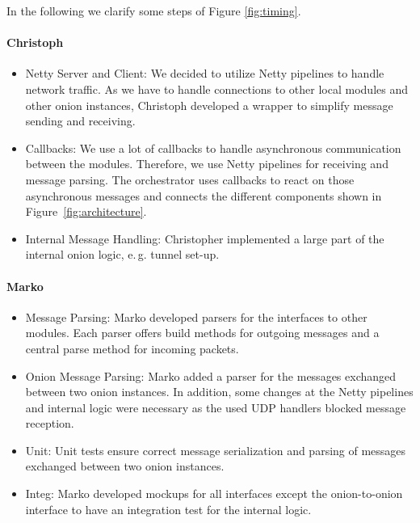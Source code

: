 \documentclass[paper=letter, fontsize=12pt]{article}
\begin{document}
\noindent
In the following we clarify some steps of Figure \ref{fig:timing}.
\paragraph{Christoph}
    \begin{itemize}
        \item Netty Server and Client: We decided to utilize Netty pipelines to handle network traffic. As we have to handle connections to other local modules and other onion instances, Christoph developed a wrapper to simplify message sending and receiving.
        \item Callbacks: We use a lot of callbacks to handle asynchronous communication between the modules. Therefore, we use Netty pipelines for receiving and message parsing. The orchestrator uses callbacks to react on those asynchronous messages and connects the different components shown in Figure~\ref{fig:architecture}.
        \item Internal Message Handling: Christopher implemented a large part of the internal onion logic, e.\,g. tunnel set-up.
    \end{itemize}
\paragraph{Marko}
    \begin{itemize}
        \item Message Parsing: Marko developed parsers for the interfaces to other modules. Each parser offers build methods for outgoing messages and a central parse method for incoming packets. 
        \item Onion Message Parsing: Marko added a parser for the messages exchanged between two onion instances. In addition, some changes at the Netty pipelines and internal logic were necessary as the used UDP handlers blocked message reception.
        \item Unit: Unit tests ensure correct message serialization and parsing of messages exchanged between two onion instances.
        \item Integ: Marko developed mockups for all interfaces except the onion-to-onion interface to have an integration test for the internal logic.
    \end{itemize}
\end{document}
